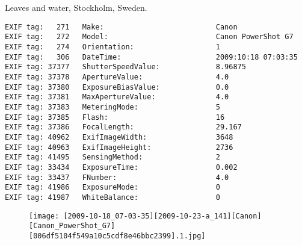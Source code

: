 \section{\protect{}}
\noindent Leaves and water, Stockholm, Sweden.
\noindent
\begin{lstlisting}
EXIF tag:   271   Make:                          Canon
EXIF tag:   272   Model:                         Canon PowerShot G7
EXIF tag:   274   Orientation:                   1
EXIF tag:   306   DateTime:                      2009:10:18 07:03:35
EXIF tag: 37377   ShutterSpeedValue:             8.96875
EXIF tag: 37378   ApertureValue:                 4.0
EXIF tag: 37380   ExposureBiasValue:             0.0
EXIF tag: 37381   MaxApertureValue:              4.0
EXIF tag: 37383   MeteringMode:                  5
EXIF tag: 37385   Flash:                         16
EXIF tag: 37386   FocalLength:                   29.167
EXIF tag: 40962   ExifImageWidth:                3648
EXIF tag: 40963   ExifImageHeight:               2736
EXIF tag: 41495   SensingMethod:                 2
EXIF tag: 33434   ExposureTime:                  0.002
EXIF tag: 33437   FNumber:                       4.0
EXIF tag: 41986   ExposureMode:                  0
EXIF tag: 41987   WhiteBalance:                  0

\end{lstlisting}
\clearpage
\begin{figure}
\raggedleft
\texttt{[image: [2009-10-18\_07-03-35][2009-10-23-a\_141][Canon][Canon\_PowerShot\_G7][006df5104f549a10c5cdf8e46bbc2399].1.jpg]}
\end{figure}


\clearpage
